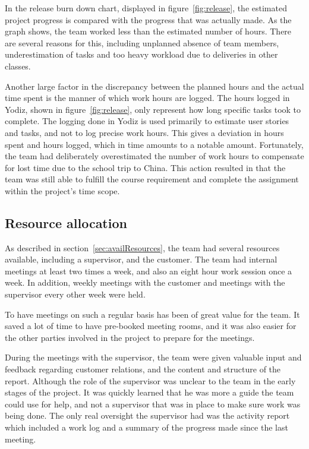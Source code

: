 \noindent In the release burn down chart, displayed in figure~\ref{fig:release}, the estimated project progress is compared with the progress that was actually made. As the graph shows, the team worked less than the estimated number of hours. There are several reasons for this, including unplanned absence of team members, underestimation of tasks and too heavy workload due to deliveries in other classes. 

Another large factor in the discrepancy between the planned hours and the actual time spent is the manner of which work hours are logged. The hours logged in Yodiz, shown in figure~\ref{fig:release}, only represent how long specific tasks took to complete. The logging done in Yodiz is used primarily to estimate user stories and tasks, and not to log precise work hours. This gives a deviation in hours spent and hours logged, which in time amounts to a notable amount. Fortunately, the team had deliberately overestimated the number of work hours to compensate for lost time due to the school trip to China. This action resulted in that the team was still able to fulfill the course requirement and complete the assignment within the project's time scope.


\subsection{Resource allocation}
As described in section~\ref{sec:availResources}, the team had several resources available, including a supervisor, and the customer. The team had internal meetings at least two times a week, and also an eight hour work session once a week. In addition, weekly meetings with the customer and meetings with the supervisor every other week were held.

To have meetings on such a regular basis has been of great value for the team. It saved a lot of time to have pre-booked meeting rooms, and it was also easier for the other parties involved in the project to prepare for the meetings.

During the meetings with the supervisor, the team were given valuable input and feedback regarding customer relations, and the content and structure of the report. Although the role of the supervisor was unclear to the team in the early stages of the project. It was quickly learned that he was more a guide the team could use for help, and not a supervisor that was in place to make sure work was being done. The only real oversight the supervisor had was the activity report which included a work log and a summary of the progress made since the last meeting.

